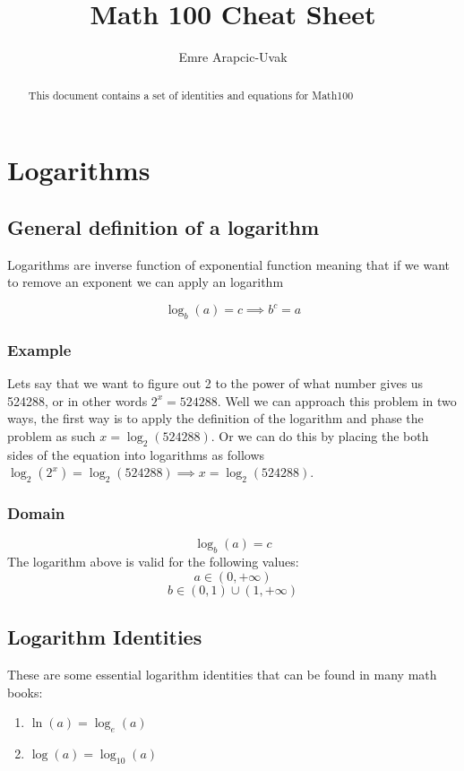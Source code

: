 \documentclass[a4paper, 15pt]{article}
\title{Math 100 Cheat Sheet}
\author{Emre Arapcic-Uvak}
\date{}
\begin{document}
	\maketitle
	\vspace{5mm}
	
	\begin{abstract}
		\begin{center}
			\noindent This document contains a set of identities and equations for Math100
		\end{center}
	\end{abstract}
	\pagebreak
	
	\tableofcontents
	\pagebreak
	
	\section{Logarithms}
		\subsection{General definition of a logarithm}
			\noindent Logarithms are inverse function of exponential function meaning that if we want to remove an exponent we can apply an logarithm
			
			\begin{equation*}
				\log_{b}(a) = c \implies b^c = a
			\end{equation*}
		
			\subsubsection{Example}
				\noindent Lets say that we want to figure out 2 to the power of what number gives us 524288, or in other words $2^x = 524288$. Well we can approach this problem in two ways, the first way is to apply the definition of the logarithm and phase the problem as such $x = \log_{2}(524288)$. Or we can do this by placing the both sides of the equation into logarithms as follows $\log_{2}(2^x) = \log_{2}(524288) \implies x = \log_{2}(524288)$.
				
				
			\subsubsection{Domain}
				\[\log_{b}(a) = c\]
				\noindent The logarithm above is valid for the following values:
				\[a \in (0, +\infty)\]
				\[b \in (0,1) \cup (1, +\infty)\]
		\subsection{Logarithm Identities}
			\noindent These are some essential logarithm identities that can be found in many math books:
			\begin{enumerate}
				\item $\ln(a) = \log_{e}(a)$
				\item $\log(a) = \log_{10}(a)$
			\end{enumerate}
\end{document}
